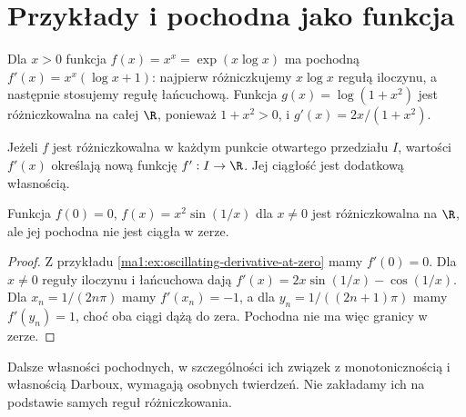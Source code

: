 \section{Przykłady i pochodna jako funkcja}
\begin{przyklad}
\label{ma1:ex:derivative-composition}
Dla $x>0$ funkcja $f(x)=x^x=\exp(x\log x)$ ma pochodną
$f'(x)=x^x(\log x+1)$: najpierw różniczkujemy $x\log x$ regułą iloczynu, a następnie stosujemy regułę łańcuchową. Funkcja $g(x)=\log(1+x^2)$ jest różniczkowalna na całej $\R$, ponieważ $1+x^2>0$, i $g'(x)=2x/(1+x^2)$.
\end{przyklad}
Jeżeli $f$ jest różniczkowalna w każdym punkcie otwartego przedziału $I$, wartości $f'(x)$ określają nową funkcję $f':I\to\R$. Jej ciągłość jest dodatkową własnością.
\begin{przyklad}
\label{ma1:ex:discontinuous-derivative}
Funkcja $f(0)=0$, $f(x)=x^2\sin(1/x)$ dla $x\ne0$ jest różniczkowalna na $\R$, ale jej pochodna nie jest ciągła w zerze.
\end{przyklad}
\begin{proof}
Z przykładu \ref{ma1:ex:oscillating-derivative-at-zero} mamy $f'(0)=0$. Dla $x\ne0$ reguły iloczynu i łańcuchowa dają
$f'(x)=2x\sin(1/x)-\cos(1/x)$.
Dla $x_n=1/(2n\pi)$ mamy $f'(x_n)=-1$, a dla $y_n=1/((2n+1)\pi)$ mamy $f'(y_n)=1$, choć oba ciągi dążą do zera. Pochodna nie ma więc granicy w zerze.
\end{proof}
Dalsze własności pochodnych, w szczególności ich związek z monotonicznością i własnością Darboux, wymagają osobnych twierdzeń. Nie zakładamy ich na podstawie samych reguł różniczkowania.
